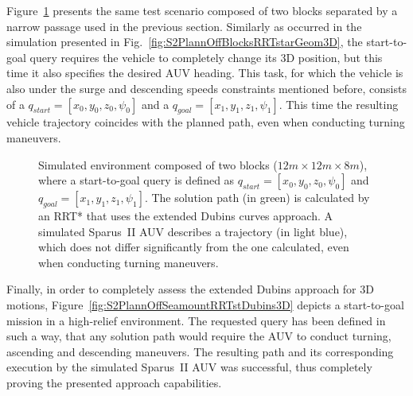 Figure~\ref{fig:S2PlannOffBlocksRRTstarDubins3D} presents the same test scenario
composed of two blocks separated by a narrow passage used in the previous
section. Similarly as occurred in the simulation presented in
Fig.~\ref{fig:S2PlannOffBlocksRRTstarGeom3D}, the start-to-goal query requires
the vehicle to completely change its \ac{3D} position, but this time it also
specifies the desired \ac{AUV} heading. This task, for which the vehicle is also
under the surge and descending speeds constraints mentioned before, consists
of a $q_{start} = [x_0, y_0, z_0, \psi_0]$ and a $q_{goal} = [x_1, y_1, z_1,
\psi_1]$. This time the resulting vehicle trajectory coincides with the planned
path, even when conducting turning maneuvers.

\begin{figure}[htbp]
    \myfloatalign
     \quad
     \quad
\caption[Simulation of the Sparus~II AUV attempting to follow a 3D solution path
calculated by an RRT* that uses the extended Dubins curves approach.]
{Simulated environment composed of two blocks ($12m \times 12m \times 8m$),
where a start-to-goal query is defined as $q_{start} = [x_0, y_0, z_0, \psi_0]$ and
$q_{goal} = [x_1, y_1, z_1, \psi_1]$. The solution path (in green) is calculated
by an RRT* that uses the extended Dubins curves approach. A simulated Sparus~II
AUV describes a trajectory (in light blue), which does not differ significantly
from the one calculated, even when conducting turning maneuvers.}
\label{fig:S2PlannOffBlocksRRTstarDubins3D}
\end{figure}

Finally, in order to completely assess the extended Dubins approach for \ac{3D}
motions, Figure~\ref{fig:S2PlannOffSeamountRRTstDubins3D} depicts a
start-to-goal mission in a high-relief environment. The requested query has been
defined in such a way, that any solution path would require the \ac{AUV} to
conduct turning, ascending and descending maneuvers. The resulting path and its
corresponding execution by the simulated Sparus~II \ac{AUV} was successful, thus
completely proving the presented approach capabilities.

